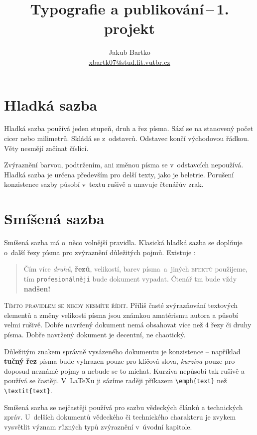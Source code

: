 \documentclass[a4paper, 10pt, twocolumn]{article}
\title{Typografie a publikování\,--\,1. projekt}
\author{Jakub Bartko \\ \href{ mailto:xbartk07@stud.fit.vutbr.cz}{xbartk07@stud.fit.vutbr.cz}}
\date{}
\begin{document}
\maketitle

\section{Hladká sazba}
Hladká sazba používá jeden stupeň, druh a řez písma.
Sází se na stanovený počet cicer nebo milimetrů.
Skládá se z~odstavců. Odstavec končí východovou řádkou.
Věty nesmějí začínat číslicí.

Zvýraznění barvou, podtržením, ani změnou písma se v~odstavcích nepoužívá.
Hladká sazba je určena především pro delší texty, jako je beletrie.
Porušení konzistence sazby působí v~textu rušivě a unavuje čtenářův zrak.


\section{Smíšená sazba}
\label{sec2}
Smíšená sazba má o~něco volnější pravidla.
Klasická hladká sazba se doplňuje o~další řezy písma pro zvýraznění důležitých pojmů.
Existuje :

\begin{quotation}
Čím více \emph{druhů}, \textbf{řezů}, {\tiny velikostí}, {\color{red} barev} písma~a~jiných \textsc{efektů} použijeme, tím \texttt{profesionálněji} bude {\Large {}\selectfont dokument} vypadat.
{\huge Č}{\LARGE t}{\Large e}{\large n}á{\small ř} {\footnotesize t}{}{\tiny m} bude vždy {\Huge \textbf{nadšen!}}
\end{quotation}

\textsc{Tímto pravidlem se nikdy nesmíte řídit.}
Příliš časté zvýrazňování textových elementů a změny velikosti písma jsou známkou amatérismu autora a působí velmi rušivě.
Dobře navržený dokument nemá obsahovat více než 4 řezy či druhy písma.
Dobře navržený dokument je decentní, ne chaotický.

Důležitým znakem správně vysázeného dokumentu je konzistence -- například \textbf{tučný řez} písma bude vyhrazen pouze pro klíčová slova, \emph{kurzíva} pouze pro doposud neznámé pojmy a nebude se to míchat.
Kurzíva nepůsobí tak rušivě a používá se častěji.
V~\LaTeX u ji sázíme raději příkazem \verb|\emph{text}| než \verb|\textit{text}|.

Smíšená sazba se nejčastěji používá pro sazbu vědeckých článků a technických zpráv.
U~delších dokumentů vědeckého či technického charakteru je zvykem vysvětlit význam různých typů zvýraznění v~úvodní kapitole.
\end{document}
